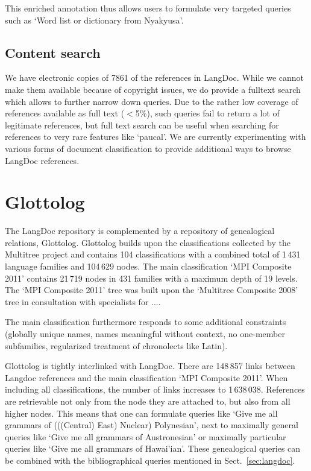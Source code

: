 \documentclass[10pt, a4paper]{article}
\begin{document}
This enriched annotation thus allows users to formulate very targeted queries such as `Word list or dictionary from Nyakyusa'.

\subsection{Content search}
We have electronic copies of 7861 of the references in LangDoc. While we cannot make them available because of copyright issues, we do provide a fulltext search which allows to further narrow down queries. Due to the rather low coverage of references available as full text ($<$5\%), such queries fail to return a lot of legitimate references, but full text search can be useful when searching for references to very rare features like `paucal'. We are currently experimenting with various forms of document classification to provide additional ways to browse LangDoc references. 


\section{Glottolog}
The LangDoc repository is complemented by a repository of genealogical relations, Glottolog. Glottolog builds upon the classifications collected by the Multitree project\cite{} and contains 104 classifications with a combined total of 1\,431 language families and 104\,629 nodes. The main classification `MPI Composite 2011' contains 21\,719 nodes in 431 families with a maximum depth of 19 levels. The `MPI Composite 2011' tree was built upon the `Multitree Composite 2008' tree in consultation with specialists for 
....

The main classification furthermore responds to some additional constraints (globally unique names,  names meaningful without context, no one-member subfamilies, regularized treatment of chronolects like Latin).

Glottolog is tightly interlinked with LangDoc. There are 148\,857 links between Langdoc references and the main classification `MPI Composite 2011'. When including all classifications, the number of links increases to  1\,638\,038.
References are retrievable not only from the node they are attached to, but also from all higher nodes. This means that one can formulate queries like `Give me all grammars of (((Central) East) Nuclear) Polynesian', next to maximally general queries like `Give me all grammars of Austronesian' or maximally particular queries like `Give me all grammars of Hawai'ian'. These genealogical queries can be combined with the bibliographical queries mentioned in Sect.\, \ref{sec:langdoc}.
\end{document}
